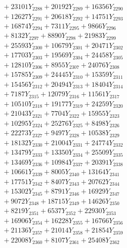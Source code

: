 \documentclass[a4paper,10pt]{article}
\begin{document}
{\begin{align}
&\;  + 23101 Y_{2288} + 20192 Y_{2289} + 16356 Y_{2290} \\[0.3ex]
&\;  + 12627 Y_{2291} + 20618 Y_{2292} + 14751 Y_{2293} \\[0.3ex]
&\;  + 16874 Y_{2294} + 7311 Y_{2295} + 9866 Y_{2296} \\[0.3ex]
&\;  + 8132 Y_{2297} + 8890 Y_{2298} + 21983 Y_{2299} \\[0.3ex]
&\;  + 25593 Y_{2300} + 10679 Y_{2301} + 20471 Y_{2302} \\[0.3ex]
&\;  + 17703 Y_{2303} + 19569 Y_{2304} + 24458 Y_{2305} \\[0.3ex]
&\;  + 12810 Y_{2306} + 8955 Y_{2307} + 24076 Y_{2308} \\[0.5ex]\allowbreak
&\;  + 15785 Y_{2309} + 24445 Y_{2310} + 15359 Y_{2311} \\[0.3ex]
&\;  + 15456 Y_{2312} + 20494 Y_{2313} + 18404 Y_{2314} \\[0.3ex]
&\;  + 7187 Y_{2315} + 12079 Y_{2316} + 11561 Y_{2317} \\[0.3ex]
&\;  + 10510 Y_{2318} + 19177 Y_{2319} + 24259 Y_{2320} \\[0.3ex]
&\;  + 21043 Y_{2321} + 7704 Y_{2322} + 15955 Y_{2323} \\[0.3ex]
&\;  + 10295 Y_{2324} + 25276 Y_{2325} + 8498 Y_{2326} \\[0.3ex]
&\;  + 22273 Y_{2327} + 9497 Y_{2328} + 10538 Y_{2329} \\[0.3ex]
&\;  + 18132 Y_{2330} + 21004 Y_{2331} + 24774 Y_{2332} \\[0.3ex]
&\;  + 13479 Y_{2333} + 13350 Y_{2334} + 25509 Y_{2335} \\[0.3ex]
&\;  + 13469 Y_{2336} + 10984 Y_{2337} + 20391 Y_{2338} \\[0.5ex]\allowbreak
&\;  + 10661 Y_{2339} + 8005 Y_{2340} + 13164 Y_{2341} \\[0.3ex]
&\;  + 17751 Y_{2342} + 8407 Y_{2343} + 20762 Y_{2344} \\[0.3ex]
&\;  + 15302 Y_{2345} + 8791 Y_{2346} + 16929 Y_{2347} \\[0.3ex]
&\;  + 9072 Y_{2348} + 18715 Y_{2349} + 14626 Y_{2350} \\[0.3ex]
&\;  + 8219 Y_{2351} + 6537 Y_{2352} + 22930 Y_{2353} \\[0.3ex]
&\;  + 16906 Y_{2354} + 16228 Y_{2355} + 16766 Y_{2356} \\[0.3ex]
&\;  + 21136 Y_{2357} + 21014 Y_{2358} + 21854 Y_{2359} \\[0.3ex]
&\;  + 22008 Y_{2360} + 8107 Y_{2361} + 25408 Y_{2362} \\[0.3ex]

\end{align}}
\end{document}

